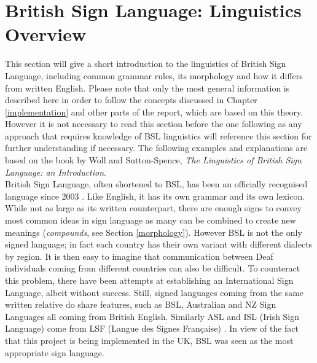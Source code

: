 \documentclass[12pt]{ociamthesis}  %
\begin{document}
\section{British Sign Language: Linguistics Overview}
This section will give a short introduction to the linguistics of British Sign Language, including common grammar rules, its morphology and how it differs from written English. Please note that only the most general information is described here in order to follow the concepts discussed in Chapter \ref{implementation} and other parts of the report, which are based on this theory. However it is not necessary to read this section before the one following as any approach that requires knowledge of BSL linguistics will reference this section for further understanding if necessary. The following examples and explanations are based on the book by Woll and Sutton-Spence, \textit{The Linguistics of British Sign Language: an Introduction}. \\

British Sign Language, often shortened to BSL, has been an officially recognised language since 2003 . Like English, it has its own grammar  and its own lexicon. While not as large as its written counterpart, there are enough signs to convey most common ideas in sign language as many can be combined to create new meanings (\textit{compounds}, see Section \ref{morphology}). However BSL is not the only signed language; in fact each country has their own variant with different dialects by region. It is then easy to imagine that communication between Deaf individuals coming from different countries can also be difficult. To counteract this problem, there have been attempts at establishing an International Sign Language, albeit without success. Still, signed languages coming from the same written relative do share features, such as BSL, Australian and NZ Sign Languages all coming from British English. Similarly ASL and ISL (Irish Sign Language) come from LSF (Langue des Signes Fran\c{c}aise) . In view of the fact that this project is being implemented in the UK, BSL was seen as the most appropriate sign language.
\end{document}
